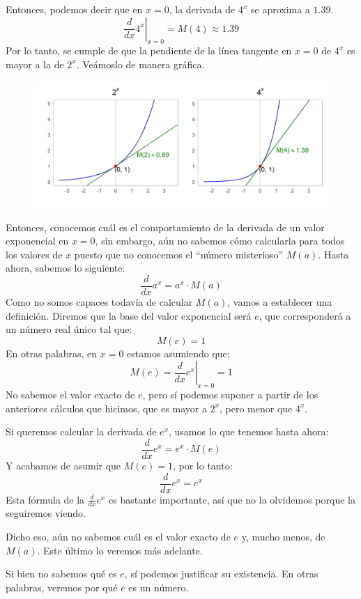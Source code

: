 \documentclass[12pt]{article}
\begin{document}
Entonces, podemos decir que en $x = 0$, la derivada de $4^{x}$ se aproxima a $1.39$.
\[\left. \frac{d}{dx} 4^{x} \right|_{x = 0} = M(4) \approx 1.39\]
Por lo tanto, se cumple de que la pendiente de la línea tangente en $x = 0$ de $4^{x}$ es mayor a la de $2^{x}$. Veámoslo de manera gráfica.

\begin{figure}[hbt!]
\centering
\includegraphics[scale=0.7]{img/exp_plot_4.jpg}
\end{figure}

Entonces, conocemos cuál es el comportamiento de la derivada de un valor exponencial en $x = 0$, sin embargo, aún no sabemos cómo calcularla para todos los valores de $x$ puesto que no conocemos el ``número misterioso'' $M(a)$. Hasta ahora, sabemos lo siguiente:
\[\frac{d}{dx} a^{x} = a^{x} \cdot M(a)\]
Como no somos capaces todavía de calcular $M(a)$, vamos a establecer una definición. Diremos que la base del valor exponencial será $e$, que corresponderá a un número real único tal que:
\[M(e) = 1\]
En otras palabras, en $x = 0$ estamos asumiendo que:
\[M(e) = \left. \frac{d}{dx} e^{x} \right |_{x = 0}= 1\]
No sabemos el valor exacto de $e$, pero sí podemos suponer a partir de los anteriores cálculos que hicimos, que es mayor a $2^{x}$, pero menor que $4^{x}$.

Si queremos calcular la derivada de $e^{x}$, usamos lo que tenemos hasta ahora:
\[\frac{d}{dx} e^{x} = e^{x} \cdot M(e)\]
Y acabamos de asumir que $M(e) = 1$, por lo tanto:
\[\frac{d}{dx} e^{x} = e^{x}\]
Esta fórmula de la $\frac{d}{dx} e^{x}$ es bastante importante, así que no la olvidemos porque la seguiremos viendo.

Dicho eso, aún no sabemos cuál es el valor exacto de $e$ y, mucho menos, de $M(a)$. Este último lo veremos más adelante.

Si bien no sabemos qué es $e$, sí podemos justificar su existencia. En otras palabras, veremos por qué $e$ es un número.
\end{document}
